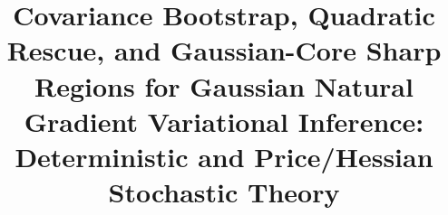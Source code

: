 \newcommand{\R}{\mathbb{R}}
\newcommand{\N}{\mathcal{N}}
\newcommand{\E}{\mathbb{E}}
\newcommand{\Prob}{\mathbb{P}}
\newcommand{\Var}{\operatorname{Var}}
\newcommand{\KL}{\mathrm{KL}}
\newcommand{\Tr}{\operatorname{Tr}}
\newcommand{\SPD}{\mathbb{S}_{++}}
\newcommand{\Sym}{\mathbb{S}}
\newcommand{\Id}{I}
\newcommand{\dd}{\mathrm{d}}
\newcommand{\grad}{\operatorname{grad}}
\newcommand{\op}{\mathrm{op}}
\newcommand{\Frob}{\mathrm{F}}
\newcommand{\post}{\mathrm{post}}
\newcommand{\FR}{\mathrm{FR}}
\newcommand{\BW}{\mathrm{BW}}
\newcommand{\Riem}{\mathrm{R}}
\newcommand{\calE}{\mathcal{E}}
\newcommand{\PG}{\mathcal{P}_{\mathrm G}}
\newcommand{\Aspace}{\mathcal{A}}
\newcommand{\Fil}{\mathcal{F}}
\newcommand{\STL}{\mathrm{STL}}
\newcommand{\norm}[1]{\left\lVert #1\right\rVert}
\newcommand{\inner}[2]{\left\langle #1,#2\right\rangle}
\newcommand{\logp}{\log_+}
\newcommand{\glob}{\mathrm{glob}}
\newcommand{\cov}{\mathrm{cov}}
\newcommand{\loc}{\mathrm{loc}}
\newcommand{\Gradnorm}{\mathsf{G}}
\newcommand{\LH}{L_H}
\newcommand{\barLH}{\overline{L}_H}
\newcommand{\LB}{L_\Lambda}
\newcommand{\Retr}{\operatorname{Retr}}
\newcommand{\Kresc}{\mathsf{K}}
\newcommand{\Fresc}{\mathsf{F}}
\newcommand{\diag}{\operatorname{diag}}
\newcommand{\Ureg}{\mathcal{U}}
\newcommand{\Hreg}{\mathcal{H}}
\newcommand{\FGauss}{F_{\mathrm G}}
\newcommand{\gstar}{\gamma_\star}
\newcommand{\gund}{\underline{\gamma}}
\newcommand{\Lstar}{L_\star}
\newcommand{\sharpthr}{\Delta^{\sharp}}
\newcommand{\Kng}{K_{\mathrm{ng}}}
\newcommand{\Kdisc}{K^{\mathrm{disc}}}
\newcommand{\LHs}{L_{H,\star}}

\title{Covariance Bootstrap, Quadratic Rescue, and Gaussian-Core Sharp
Regions for Gaussian Natural Gradient Variational Inference:\\
Deterministic and Price/Hessian Stochastic Theory}
\author{}
\date{}


\maketitle

